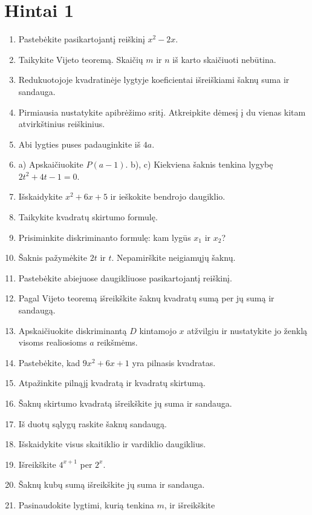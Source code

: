 \documentclass[11pt,a4paper]{scrartcl}
\begin{document}
\clearpage
\section{Hintai 1}
\begin{enumerate}
    \item Pastebėkite pasikartojantį reiškinį $x^2-2x$.
    \item Taikykite Vijeto teoremą. Skaičių $m$ ir $n$ iš karto
    skaičiuoti nebūtina.
    \item Redukuotojoje kvadratinėje lygtyje koeficientai išreiškiami
    šaknų suma ir sandauga.
    \item Pirmiausia nustatykite apibrėžimo sritį. Atkreipkite dėmesį
    į du vienas kitam atvirkštinius reiškinius.
    \item Abi lygties puses padauginkite iš $4a$.
    \item a) Apskaičiuokite $P(a-1)$.
    b), c) Kiekviena šaknis tenkina lygybę $2t^2+4t-1=0$.
    \item Išskaidykite $x^2+6x+5$ ir ieškokite bendrojo daugiklio.
    \item Taikykite kvadratų skirtumo formulę.
    \item Prisiminkite diskriminanto formulę: kam lygūs
    $x_1$ ir $x_2$?
    \item Šaknis pažymėkite $2t$ ir $t$. Nepamirškite neigiamųjų šaknų.
    \item Pastebėkite abiejuose daugikliuose pasikartojantį reiškinį.
    \item Pagal Vijeto teoremą išreikškite šaknų kvadratų sumą
    per jų sumą ir sandaugą.
    \item Apskaičiuokite diskriminantą $D$ kintamojo $x$ atžvilgiu
    ir nustatykite jo ženklą visoms realiosioms $a$ reikšmėms.
    \item Pastebėkite, kad $9x^2+6x+1$ yra pilnasis kvadratas.
    \item Atpažinkite pilnąjį kvadratą ir kvadratų skirtumą.
    \item Šaknų skirtumo kvadratą išreikškite jų suma ir sandauga.
    \item Iš duotų sąlygų raskite šaknų sandaugą.
    \item Išskaidykite visus skaitiklio ir vardiklio daugiklius.
    \item Išreikškite $4^{x+1}$ per $2^x$.
    \item Šaknų kubų sumą išreikškite jų suma ir sandauga.
    \item Pasinaudokite lygtimi, kurią tenkina $m$, ir išreikškite

\end{enumerate}
\end{document}
